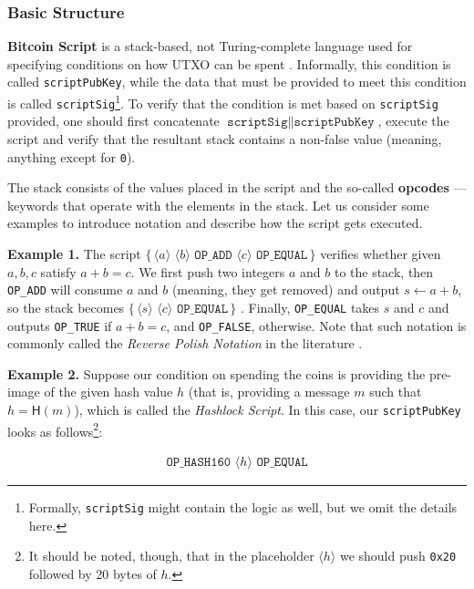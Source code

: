 \documentclass{iacrtrans}
\newcommand{\elem}[1]{\, \langle #1 \rangle \,}
\newcommand{\opcode}[1]{\, \texttt{#1} \,}
\newcommand{\script}[1]{ $\big\{ #1 \big\}$ }
\begin{document}
\subsubsection{Basic Structure}
\textbf{Bitcoin Script} is a stack-based, not Turing-complete language used for specifying conditions on how UTXO can be spent \cite{mastering_bitcoin}. Informally, this condition is called \texttt{scriptPubKey}, while the data that must be provided to meet this condition is called \texttt{scriptSig}\footnote{Formally, \texttt{scriptSig} might contain the logic as well, but we omit the details here.}. To verify that the condition is met based on \texttt{scriptSig} provided, one should first concatenate $\texttt{scriptSig} \parallel \texttt{scriptPubKey}$, execute the script and verify that the resultant stack contains a non-false value (meaning, anything except for \texttt{0}). 

The stack consists of the values placed in the script and the so-called \textbf{opcodes} --- keywords that operate with the elements in the stack. Let us consider some examples to introduce notation and describe how the script gets executed. 

\textbf{Example 1.} The script \script{\elem{a} \elem{b} \opcode{OP\_ADD} \elem{c} \opcode{OP\_EQUAL}} verifies whether given $a,b,c$ satisfy $a+b=c$. We first push two integers $a$ and $b$ to the stack, then \texttt{OP\_ADD} will consume $a$ and $b$ (meaning, they get removed) and output $s \gets a+b$, so the stack becomes \script{\elem{s} \elem{c} \opcode{OP\_EQUAL}}. Finally, \texttt{OP\_EQUAL} takes $s$ and $c$ and outputs \texttt{OP\_TRUE} if $a+b=c$, and \texttt{OP\_FALSE}, otherwise. Note that such notation is commonly called the \textit{Reverse Polish Notation} in the literature \cite{reverse_polish_notation}.

\textbf{Example 2.} Suppose our condition on spending the coins is providing the pre-image of the given hash value $h$ (that is, providing a message $m$ such that $h = \mathsf{H}(m)$), which is called the \textit{Hashlock Script}. In this case, our \texttt{scriptPubKey} looks as follows\footnote{It should be noted, though, that in the placeholder $\langle h \rangle$ we should push \texttt{0x20} followed by 20 bytes of $h$.}:
\begin{empheqboxed}
\begin{align*}
    \opcode{OP\_HASH160} \elem{h} \opcode{OP\_EQUAL}
\end{align*}
\end{empheqboxed}
\end{document}
